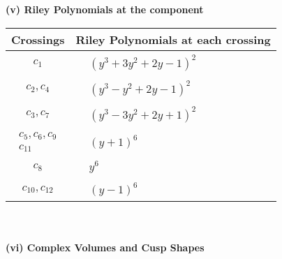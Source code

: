 \documentclass[1p]{elsarticle_modified}
\theoremstyle{definition}
\begin{document}
\newpage\renewcommand{\arraystretch}{1}
\flushleft \textbf{(v) Riley Polynomials at the component}\newline \\
\begin{tabular}{m{50pt}|m{274pt}}
Crossings & \hspace{64pt}Riley Polynomials at each crossing \\
\hline $$\begin{aligned}c_{1}\end{aligned}$$&$\begin{aligned}
&(y^3+3 y^2+2 y-1)^2
\end{aligned}$\\
\hline $$\begin{aligned}c_{2},c_{4}\end{aligned}$$&$\begin{aligned}
&(y^3- y^2+2 y-1)^2
\end{aligned}$\\
\hline $$\begin{aligned}c_{3},c_{7}\end{aligned}$$&$\begin{aligned}
&(y^3-3 y^2+2 y+1)^2
\end{aligned}$\\
\hline $$\begin{aligned}c_{5},c_{6},c_{9}\\c_{11}\end{aligned}$$&$\begin{aligned}
&(y+1)^6
\end{aligned}$\\
\hline $$\begin{aligned}c_{8}\end{aligned}$$&$\begin{aligned}
&y^6
\end{aligned}$\\
\hline $$\begin{aligned}c_{10},c_{12}\end{aligned}$$&$\begin{aligned}
&(y-1)^6
\end{aligned}$\\
\hline
\end{tabular}\\~\\
\newpage\flushleft \textbf{(vi) Complex Volumes and Cusp Shapes}
\end{document}
